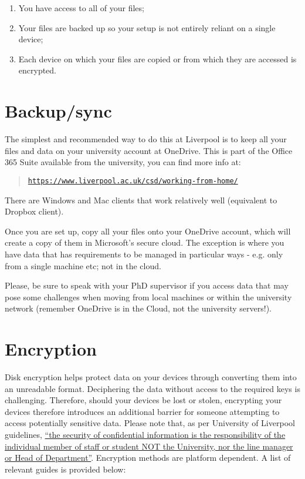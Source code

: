 \documentclass[
]{book}
\providecommand{\tightlist}{%
  \setlength{\itemsep}{0pt}\setlength{\parskip}{0pt}}
\begin{document}
\begin{enumerate}
\def\labelenumi{\alph{enumi})}
\tightlist
\item
  You have access to all of your files;
\item
  Your files are backed up so your setup is not entirely reliant on a single device;
\item
  Each device on which your files are copied or from which they are accessed
  is encrypted.
\end{enumerate}

\hypertarget{backupsync}{%
\section{Backup/sync}\label{backupsync}}

The simplest and recommended way to do this at Liverpool is to keep all your
files and data on your university account at OneDrive. This is part of the
Office 365 Suite available from the university, you can find more info at:

\begin{quote}
\href{https://www.liverpool.ac.uk/csd/working-from-home/}{\texttt{https://www.liverpool.ac.uk/csd/working-from-home/}}
\end{quote}

There are Windows and Mac clients that work relatively well (equivalent to
Dropbox client).

Once you are set up, copy all your files onto your OneDrive account, which
will create a copy of them in Microsoft's secure cloud. The exception is
where you have data that has requirements to be managed in particular ways - e.g.
only from a single machine etc; not in the cloud.

Please, be sure to speak with your PhD supervisor if you access data that
may pose some challenges when moving from local machines or within the university
network (remember OneDrive is in the Cloud, not the university servers!).

\hypertarget{encryption}{%
\section{Encryption}\label{encryption}}

Disk encryption helps protect data on your devices through converting
them into an unreadable format. Deciphering the data without access to the
required keys is challenging. Therefore, should your devices be lost or stolen,
encrypting your devices therefore introduces an additional barrier for someone
attempting to access potentially sensitive data. Please note that, as per
University of Liverpool guidelines,
\href{https://www.liverpool.ac.uk/csd/security/information-security/encryption/}{``the security of confidential information is the responsibility of the individual
member of staff or student NOT the University, nor the line manager or Head of
Department''}.
Encryption methods are platform dependent. A list of relevant guides is provided below:
\end{document}
